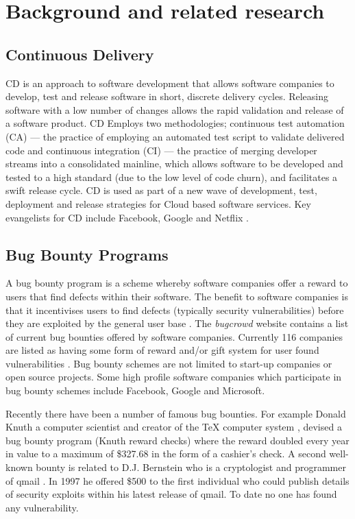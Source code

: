 \documentclass[conference]{IEEEtran}
\begin{document}

\section{Background and related research}

\subsection{Continuous Delivery}
CD is an approach to software development that allows software companies to develop, test and release software in short, discrete delivery cycles. Releasing software with a low number of changes allows the rapid validation and release of a software product. CD Employs two methodologies; continuous test automation (CA) ---  the practice of employing an automated test script to validate delivered code and continuous integration (CI) --- the practice of merging developer streams into a consolidated mainline, which allows software to be developed and tested to a high standard (due to the low level of code churn), and facilitates a swift release cycle. CD is used as part of a new wave of development, test, deployment and release strategies for Cloud based software services. Key evangelists for CD include Facebook, Google and Netflix \cite{quora2014}. 

\subsection{Bug Bounty Programs}
A bug bounty program is a scheme whereby software companies offer a reward to users that find defects within their software. The benefit to software companies is that it incentivises users to find defects (typically security vulnerabilities) before they are exploited by the general user base \cite{wiki2015bugbounty}. The \emph{bugcrowd} website contains a list of current bug bounties offered by software companies.  Currently 116 companies are listed as having some form of reward and/or gift system for user found vulnerabilities \cite{bugcrowd2015}. Bug bounty schemes are not limited to start-up companies or open source projects.  Some high profile software companies which participate in bug bounty schemes include Facebook, Google and Microsoft. \par
Recently there have been a number of famous bug bounties. For example Donald Knuth a computer scientist and creator of the TeX computer system \cite{Knuth2015}, devised a bug bounty program (Knuth reward checks) where the reward doubled every year in value to a maximum of  \$327.68 in the form of a cashier's check. A second well-known bounty is related to D.J. Bernstein who is a cryptologist and programmer of qmail \cite{Bernstein2015}. In 1997 he offered \$500 to the first individual who could publish details of security exploits within his latest release of qmail. To date no one has found any vulnerability.
\end{document}
